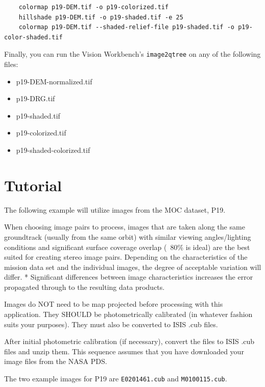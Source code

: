 \begin{verbatim}
	colormap p19-DEM.tif -o p19-colorized.tif
	hillshade p19-DEM.tif -o p19-shaded.tif -e 25
	colormap p19-DEM.tif --shaded-relief-file p19-shaded.tif -o p19-color-shaded.tif
\end{verbatim}

Finally, you can run the Vision Workbench's \texttt{image2qtree} on any of the following files:

\begin{itemize}
\item p19-DEM-normalized.tif
\item p19-DRG.tif 
\item p19-shaded.tif
\item p19-colorized.tif
\item p19-shaded-colorized.tif
\end{itemize}


\section{Tutorial}

The following example will utilize images from the MOC dataset, P19.

When choosing image pairs to process, images that are taken along
the same groundtrack (usually from the same orbit) with similar
viewing angles/lighting conditions and significant surface coverage
overlap (~80\% is ideal) are the best suited for creating stereo
image pairs. Depending on the characteristics of the mission data
set and the individual images, the degree of acceptable variation
will differ. * Significant differences between image characteristics
increases the error propagated through to the resulting data products.

Images do NOT need to be map projected before processing with this
application. They SHOULD be photometrically calibrated (in whatever
fashion suits your purposes). They must also be converted to ISIS
.cub files.

After initial photometric calibration (if necessary), convert the
files to ISIS .cub files and unzip them. This sequence assumes that
you have downloaded your image files from the NASA PDS.

The two example images for P19 are \texttt{E0201461.cub} and 
\texttt{M0100115.cub}.

